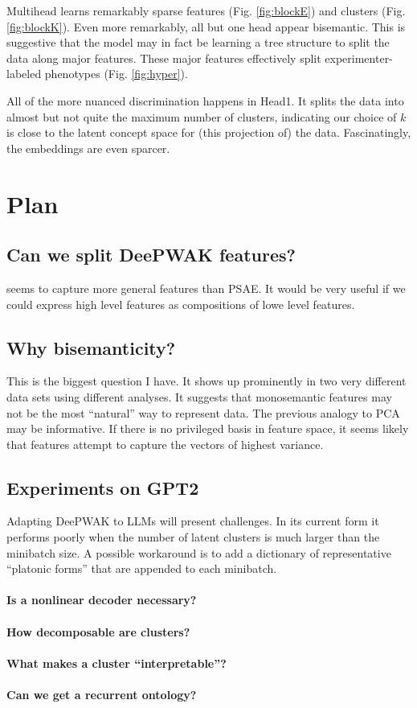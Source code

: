 Multihead \DeePWAK learns remarkably sparse features (Fig. \ref{fig:blockE}) and clusters (Fig. \ref{fig:blockK}). 
Even more remarkably, all but one head appear bisemantic.
This is suggestive that the model may in fact be learning a tree structure to split the data along major features. These major features effectively split experimenter-labeled phenotypes (Fig. \ref{fig:hyper}). 

All of the more nuanced discrimination happens in \textsf{Head1}.
It splits the data into almost but not quite the maximum number of clusters, indicating our choice of $k$ is close to the latent concept space for (this projection of) the data.
Fascinatingly, the embeddings are even sparcer.

\section{Plan}

\subsection{Can we split DeePWAK features?}
\DeePWAK seems to capture more general features than PSAE.
It would be very useful if we could express high level features as compositions of lowe level features.

\subsection{Why bisemanticity?}
This is the biggest question I have. It shows up prominently in two very different data sets using different analyses.
It suggests that monosemantic features may not be the most ``natural'' way to represent data.
The previous analogy to PCA may be informative.
If there is no privileged basis in feature space, it seems likely that features attempt to capture the vectors of highest variance.

\subsection{Experiments on GPT2}
Adapting DeePWAK to LLMs will present challenges.
In its current form it performs poorly when the number of latent clusters is much larger than the minibatch size.
A possible workaround is to add a dictionary of representative ``platonic forms'' that are appended to each minibatch.

\paragraph{Is a nonlinear decoder necessary?}

\paragraph{How decomposable are clusters?}

\paragraph{What makes a cluster ``interpretable''?}

\paragraph{Can we get a recurrent ontology?}

